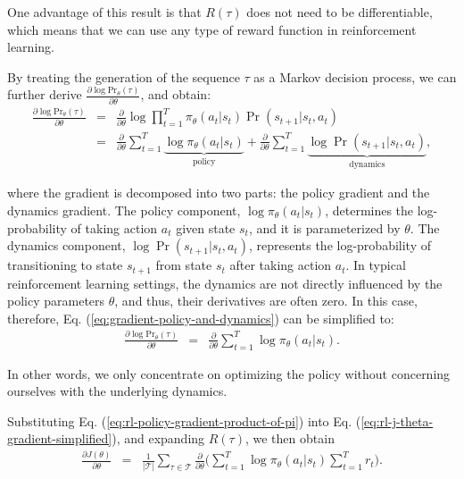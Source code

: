 \noindent One advantage of this result is that $R(\tau)$ does not need to be differentiable, which means that we can use any type of reward function in reinforcement learning.

By treating the generation of the sequence $\tau$ as a Markov decision process, we can further derive $\frac{\partial \log \mathrm{Pr}_{\theta}(\tau)}{\partial \theta}$, and obtain:
\begin{eqnarray}
\frac{\partial \log \mathrm{Pr}_{\theta}(\tau)}{\partial \theta} & = & \frac{\partial}{\partial \theta} \log \prod_{t=1}^{T} \pi_{\theta}(a_t|s_t) \Pr(s_{t+1}|s_t,a_t) \nonumber \\
& = & \frac{\partial}{\partial \theta} \sum_{t=1}^{T} \underbrace{\log \pi_{\theta}(a_t|s_t)}_{\text{policy}} + \frac{\partial}{\partial \theta} \sum_{t=1}^{T} \underbrace{\log \Pr(s_{t+1}|s_t,a_t)}_{\text{dynamics}}, \label{eq:gradient-policy-and-dynamics}
\end{eqnarray}

\noindent where the gradient is decomposed into two parts: the policy gradient and the dynamics gradient. The policy component, $\log \pi_{\theta}(a_t|s_t)$, determines the log-probability of taking action $a_t$ given state $s_t$, and it is parameterized by $\theta$. The dynamics component, $\log \Pr(s_{t+1}|s_t,a_t)$, represents the log-probability of transitioning to state $s_{t+1}$ from state $s_t$ after taking action $a_t$. In typical reinforcement learning settings, the dynamics are not directly influenced by the policy parameters $\theta$, and thus, their derivatives are often zero. In this case, therefore, Eq. (\ref{eq:gradient-policy-and-dynamics}) can be simplified to:
\begin{eqnarray}
\frac{\partial \log \mathrm{Pr}_{\theta}(\tau)}{\partial \theta} & = & \frac{\partial}{\partial \theta} \sum_{t=1}^{T} \log \pi_{\theta}(a_t|s_t). \label{eq:rl-policy-gradient-product-of-pi}
\end{eqnarray}

\noindent In other words, we only concentrate on optimizing the policy without concerning ourselves with the underlying dynamics.

Substituting Eq. (\ref{eq:rl-policy-gradient-product-of-pi}) into Eq. (\ref{eq:rl-j-theta-gradient-simplified}), and expanding $R(\tau)$, we then obtain
\begin{eqnarray}
\frac{\partial J(\theta)}{\partial \theta} & = & \frac{1}{|\mathcal{T}|} \sum_{\tau \in \mathcal{T}} \frac{\partial}{\partial \theta} \Big( \sum_{t=1}^{T} \log \pi_{\theta}(a_t|s_t) \sum_{t=1}^{T} r_t \Big).
\end{eqnarray}

